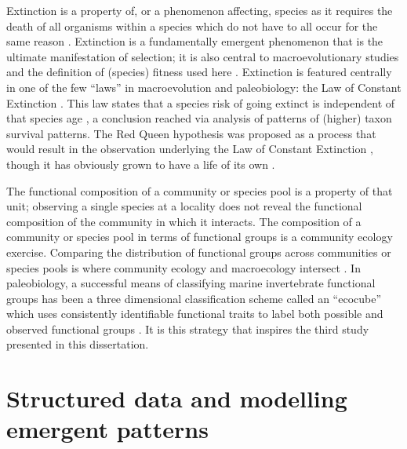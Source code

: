 Extinction is a property of, or a phenomenon affecting, species as it requires the death of all organisms within a species which do not have to all occur for the same reason \citep{Simpson2016a}. Extinction is a fundamentally emergent phenomenon that is the ultimate manifestation of selection; it is also central to macroevolutionary studies and the definition of (species) fitness used here \citep{Cooper1984}. Extinction is featured centrally in one of the few ``laws'' in macroevolution and paleobiology: the Law of Constant Extinction \citep{VanValen1973,Liow2011a}. This law states that a species risk of going extinct is independent of that species age \citep{VanValen1973,Liow2011a}, a conclusion reached via analysis of patterns of (higher) taxon survival patterns. The Red Queen hypothesis was proposed as a process that would result in the observation underlying the Law of Constant Extinction \citep{VanValen1973}, though it has obviously grown to have a life of its own \citep{Liow2011a}.

The functional composition of a community or species pool is a property of that unit; observing a single species at a locality does not reveal the functional composition of the community in which it interacts. The composition of a community or species pool in terms of functional groups is a community ecology exercise. Comparing the distribution of functional groups across communities or species pools is where community ecology and macroecology intersect \citep{Mcgill2006,Brown1995,Smith2008a}. In paleobiology, a successful means of classifying marine invertebrate functional groups has been a three dimensional classification scheme called an ``ecocube'' which uses consistently identifiable functional traits to label both possible and observed functional groups \citep{Bush2007,Bambach2007}. It is this strategy that inspires the third study presented in this dissertation.



\section{Structured data and modelling emergent patterns}



